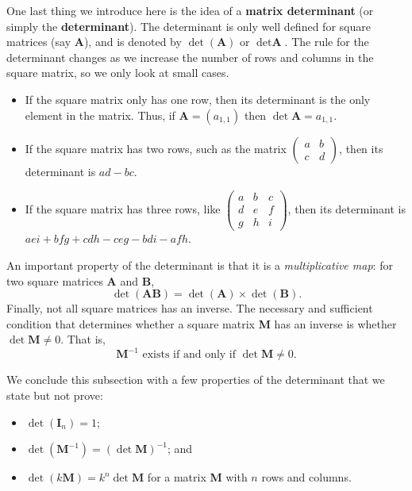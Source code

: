 One last thing we introduce here is the idea of a \textbf{matrix determinant} (or simply the \textbf{determinant}). The determinant is only well defined for square matrices (say $\textbf{A}$), and is denoted by $\det(\textbf{A})$ or $\det \textbf{A}$. The rule for the determinant changes as we increase the number of rows and columns in the square matrix, so we only look at small cases.
\begin{itemize}
    \item If the square matrix only has one row, then its determinant is the only element in the matrix. Thus, if $\textbf{A} = (a_{1,1})$ then $\det \textbf{A} = a_{1,1}$.
    \item If the square matrix has two rows, such as the matrix $\begin{pmatrix}a & b\\c & d\end{pmatrix}$, then its determinant is $ad-bc$.
    \item If the square matrix has three rows, like $\begin{pmatrix}a & b & c \\ d & e & f \\ g & h & i\end{pmatrix}$, then its determinant is $aei+bfg+cdh-ceg-bdi-afh$.
\end{itemize}
An important property of the determinant is that it is a \textit{multiplicative map}: for two square matrices \textbf{A} and \textbf{B},
\[
    \det (\textbf{AB}) = \det(\textbf{A}) \times \det(\textbf{B}).
\]
Finally, not all square matrices has an inverse. The necessary and sufficient condition that determines whether a square matrix \textbf{M} has an inverse is whether $\det \textbf{M} \neq 0$. That is,
\[
    \textbf{M}^{-1} \text{ exists if and only if } \det \textbf{M} \neq 0.
\]

We conclude this subsection with a few properties of the determinant that we state but not prove:
\begin{itemize}
    \item $\det(\textbf{I}_n) = 1$;
    \item $\det(\textbf{M}^{-1}) = \left(\det \textbf{M}\right)^{-1}$; and
    \item $\det(k\textbf{M}) = k^n \det\textbf{M}$ for a matrix \textbf{M} with $n$ rows and columns.
\end{itemize}


